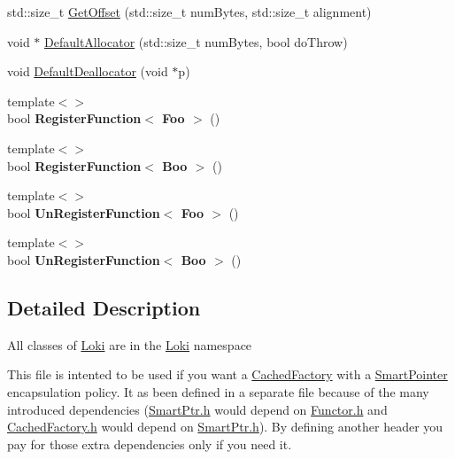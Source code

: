 \begin{DoxyCompactItemize}
\item 
std\+::size\+\_\+t \hyperlink{group__SmallObjectGroupInternal_ga2f0821e243f812a3ae2abfaea51895e8}{Get\+Offset} (std\+::size\+\_\+t num\+Bytes, std\+::size\+\_\+t alignment)
\item 
void $\ast$ \hyperlink{group__SmallObjectGroupInternal_ga2444c5bff0a61b6751fb5f57e0c7e8c7}{Default\+Allocator} (std\+::size\+\_\+t num\+Bytes, bool do\+Throw)
\item 
void \hyperlink{group__SmallObjectGroupInternal_ga1d24bf776342ace8f2004e3a173f6cb3}{Default\+Deallocator} (void $\ast$p)
\item 
\hypertarget{namespaceLoki_a2a3d2f88dde306e31bc636c174478712}{}{\footnotesize template$<$$>$ }\\bool {\bfseries Register\+Function$<$ Foo $>$} ()\label{namespaceLoki_a2a3d2f88dde306e31bc636c174478712}

\item 
\hypertarget{namespaceLoki_a05494138cc74eb477c7a647ff83da55a}{}{\footnotesize template$<$$>$ }\\bool {\bfseries Register\+Function$<$ Boo $>$} ()\label{namespaceLoki_a05494138cc74eb477c7a647ff83da55a}

\item 
\hypertarget{namespaceLoki_a2f64269ca2a07c874151285bfd865e1d}{}{\footnotesize template$<$$>$ }\\bool {\bfseries Un\+Register\+Function$<$ Foo $>$} ()\label{namespaceLoki_a2f64269ca2a07c874151285bfd865e1d}

\item 
\hypertarget{namespaceLoki_a531134d93e17bbc9cf6a467c416f7a8b}{}{\footnotesize template$<$$>$ }\\bool {\bfseries Un\+Register\+Function$<$ Boo $>$} ()\label{namespaceLoki_a531134d93e17bbc9cf6a467c416f7a8b}

\end{DoxyCompactItemize}


\subsection{Detailed Description}
All classes of \hyperlink{namespaceLoki}{Loki} are in the \hyperlink{namespaceLoki}{Loki} namespace

This file is intented to be used if you want a \hyperlink{classLoki_1_1CachedFactory}{Cached\+Factory} with a \hyperlink{classLoki_1_1SmartPointer}{Smart\+Pointer} encapsulation policy. It as been defined in a separate file because of the many introduced dependencies (\hyperlink{SmartPtr_8h_source}{Smart\+Ptr.\+h} would depend on \hyperlink{Functor_8h_source}{Functor.\+h} and \hyperlink{CachedFactory_8h_source}{Cached\+Factory.\+h} would depend on \hyperlink{SmartPtr_8h_source}{Smart\+Ptr.\+h}). By defining another header you pay for those extra dependencies only if you need it.

